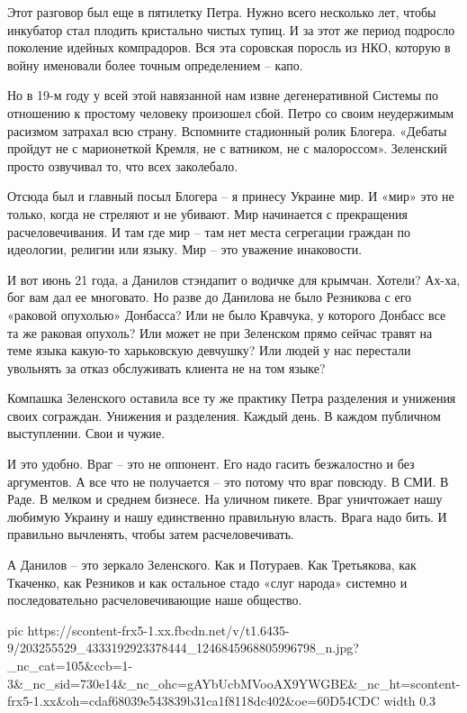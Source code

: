 Этот разговор был еще в пятилетку Петра. Нужно всего несколько лет, чтобы
инкубатор стал плодить кристально чистых тупиц. И за этот же период подросло
поколение идейных компрадоров. Вся эта соровская поросль из НКО, которую в
войну именовали более точным определением – капо.

Но в 19-м году у всей этой навязанной нам извне дегенеративной Системы по
отношению к простому человеку произошел сбой. Петро со своим неудержимым
расизмом затрахал всю страну. Вспомните стадионный ролик Блогера. «Дебаты
пройдут не с марионеткой Кремля, не с ватником, не с малороссом». Зеленский
просто озвучивал то, что всех заколебало.

Отсюда был и главный посыл Блогера – я принесу Украине мир. И «мир» это не
только, когда не стреляют и не убивают. Мир начинается с прекращения
расчеловечивания. И там где мир – там нет места сегрегации граждан по
идеологии, религии или языку. Мир – это уважение инаковости.

И вот июнь 21 года, а Данилов стэндапит о водичке для крымчан. Хотели? Ах-ха,
бог вам дал ее многовато. Но разве до Данилова не было Резникова с его «раковой
опухолью» Донбасса? Или не было Кравчука, у которого Донбасс все та же раковая
опухоль? Или может не при Зеленском прямо сейчас травят на теме языка какую-то
харьковскую девчушку? Или людей у нас перестали увольнять за отказ обслуживать
клиента не на том языке?

Компашка Зеленского оставила все ту же практику Петра разделения и унижения
своих сограждан. Унижения и разделения. Каждый день. В каждом публичном
выступлении. Свои и чужие.

И это удобно. Враг – это не оппонент. Его надо гасить безжалостно и без
аргументов. А все что не получается – это потому что враг повсюду. В СМИ. В
Раде. В мелком и среднем бизнесе. На уличном пикете. Враг уничтожает нашу
любимую Украину и нашу единственно правильную власть. Врага надо бить. И
правильно вычленять, чтобы затем расчеловечивать.

А Данилов – это зеркало Зеленского. Как и Потураев. Как Третьякова, как
Ткаченко, как Резников и как остальное стадо «слуг народа» системно и
последовательно расчеловечивающие наше общество.

\ifcmt
  pic https://scontent-frx5-1.xx.fbcdn.net/v/t1.6435-9/203255529_4333192923378444_1246845968805996798_n.jpg?_nc_cat=105&ccb=1-3&_nc_sid=730e14&_nc_ohc=gAYbUcbMVooAX9YWGBE&_nc_ht=scontent-frx5-1.xx&oh=cdaf68039e543839b31ca1f8118dc402&oe=60D54CDC
	width 0.3
\fi

